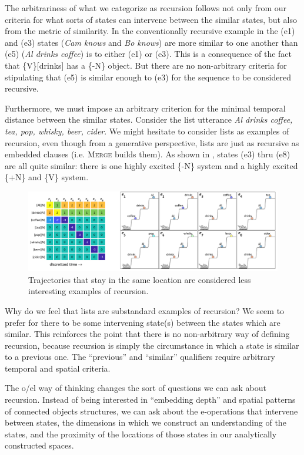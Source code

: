   The arbitrariness of what we categorize as recursion follows not only from our criteria for what sorts of states can intervene between the similar states, but also from the metric of similarity. In the conventionally recursive example in {} the (e1) and (e3) states (\textit{Cam knows} and \textit{Bo knows}) are more similar to one another than (e5) (\textit{Al drinks coffee}) is to either (e1) or (e3). This is a consequence of the fact that \{V\}[drinks] has a \{-N\} object. But there are no non-arbitrary criteria for stipulating that (e5) is similar enough to (e3) for the sequence to be considered recursive.

  Furthermore, we must impose an arbitrary criterion for the minimal temporal distance between the similar states. Consider the list utterance \textit{Al drinks coffee, tea, pop, whisky, beer, cider}. We might hesitate to consider lists as examples of recursion, even though from a generative perspective, lists are just as recursive as embedded clauses (i.e. \textsc{Merge} builds them). As shown in {}, states (e3) thru (e8) are all quite similar: there is one highly excited \{-N\} system and a highly excited \{+N\} and \{V\} system.

  
\begin{figure}
\includegraphics[width=\textwidth]{figures/Tilsen-img114.png}
\caption{Trajectories that stay in the same location are considered less interesting examples of recursion.}
\label{fig:5:10}
\end{figure}
 

  Why do we feel that lists are substandard examples of recursion? We seem to prefer for there to be some intervening state(s) between the states which are similar. This reinforces the point that there is no non-arbitrary way of defining recursion, because recursion is simply the circumstance in which a state is similar to a previous one. The “previous” and “similar” qualifiers require arbitrary temporal and spatial criteria. 

  The o/el way of thinking changes the sort of questions we can ask about recursion. Instead of being interested in “embedding depth” and spatial patterns of connected objects structures, we can ask about the e-operations that intervene between states, the dimensions in which we construct an understanding of the states, and the proximity of the locations of those states in our analytically constructed spaces.

